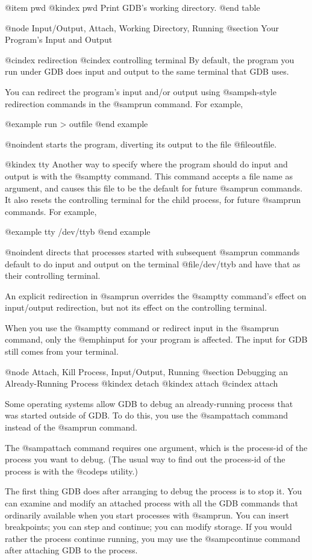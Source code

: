 @item pwd
@kindex pwd
Print GDB's working directory.
@end table

@node Input/Output, Attach, Working Directory, Running
@section Your Program's Input and Output

@cindex redirection
@cindex controlling terminal
By default, the program you run under GDB does input and output to the same
terminal that GDB uses.

You can redirect the program's input and/or output using @samp{sh}-style
redirection commands in the @samp{run} command.  For example,

@example
run > outfile
@end example

@noindent
starts the program, diverting its output to the file @file{outfile}.

@kindex tty
Another way to specify where the program should do input and output is
with the @samp{tty} command.  This command accepts a file name as
argument, and causes this file to be the default for future @samp{run}
commands.  It also resets the controlling terminal for the child
process, for future @samp{run} commands.  For example,

@example
tty /dev/ttyb
@end example

@noindent
directs that processes started with subsequent @samp{run} commands
default to do input and output on the terminal @file{/dev/ttyb} and have
that as their controlling terminal.

An explicit redirection in @samp{run} overrides the @samp{tty} command's
effect on input/output redirection, but not its effect on the
controlling terminal.

When you use the @samp{tty} command or redirect input in the @samp{run}
command, only the @emph{input for your program} is affected.  The input
for GDB still comes from your terminal.

@node Attach, Kill Process, Input/Output, Running
@section Debugging an Already-Running Process
@kindex detach
@kindex attach
@cindex attach

Some operating systems allow GDB to debug an already-running process
that was started outside of GDB.  To do this, you use the @samp{attach}
command instead of the @samp{run} command.

The @samp{attach} command requires one argument, which is the process-id
of the process you want to debug.  (The usual way to find out the
process-id of the process is with the @code{ps} utility.)

The first thing GDB does after arranging to debug the process is to stop
it.  You can examine and modify an attached process with all the GDB
commands that ordinarily available when you start processes with
@samp{run}.  You can insert breakpoints; you can step and continue; you
can modify storage.  If you would rather the process continue running,
you may use the @samp{continue} command after attaching GDB to the
process.

